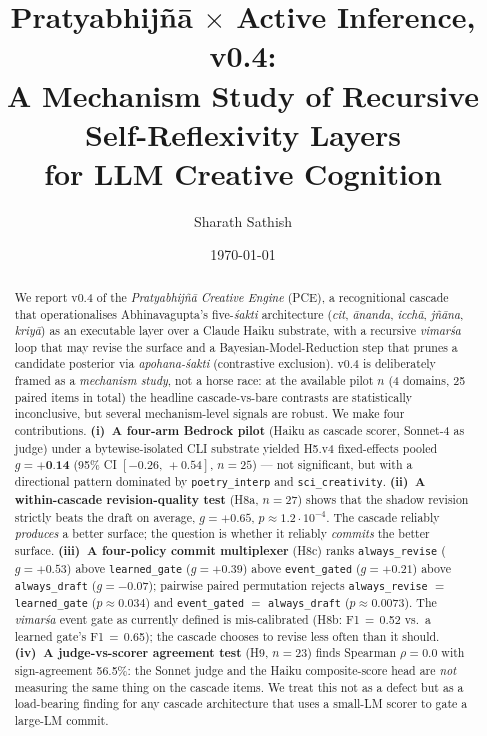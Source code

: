 \documentclass[11pt,a4paper]{article}
\title{Pratyabhij\~n\=a $\times$ Active Inference, v0.4:\\
A Mechanism Study of Recursive Self-Reflexivity Layers\\
for LLM Creative Cognition}
\author[1]{Sharath Sathish}
\affil[1]{Independent Researcher}
\date{\today}
\newcommand{\iast}[1]{\textit{#1}}
\begin{document}
\maketitle

\begin{abstract}
We report v0.4 of the \emph{Pratyabhij\~n\=a Creative Engine} (PCE), a recognitional cascade that operationalises Abhinavagupta's five-\iast{\'sakti} architecture (\iast{cit}, \iast{\=ananda}, \iast{icch\=a}, \iast{j\~n\=ana}, \iast{kriy\=a}) as an executable layer over a Claude Haiku substrate, with a recursive \iast{vimar\'sa} loop that may revise the surface and a Bayesian-Model-Reduction step that prunes a candidate posterior via \iast{apohana-\'sakti} (contrastive exclusion).
v0.4 is deliberately framed as a \emph{mechanism study}, not a horse race: at the available pilot $n$ (4 domains, 25 paired items in total) the headline cascade-vs-bare contrasts are statistically inconclusive, but several mechanism-level signals are robust. We make four contributions. \textbf{(i)~A four-arm Bedrock pilot} (Haiku as cascade scorer, Sonnet-4 as judge) under a bytewise-isolated CLI substrate yielded H5.v4 fixed-effects pooled $g=+\textbf{0.14}$ (95\% CI $[-0.26,\,+0.54]$, $n=25$) --- not significant, but with a directional pattern dominated by \texttt{poetry\_interp} and \texttt{sci\_creativity}.
\textbf{(ii)~A within-cascade revision-quality test} (H8a, $n=27$) shows that the shadow revision strictly beats the draft on average, $g=+0.65$, $p\approx 1.2\!\cdot\! 10^{-4}$. The cascade reliably \emph{produces} a better surface; the question is whether it reliably \emph{commits} the better surface.
\textbf{(iii)~A four-policy commit multiplexer} (H8c) ranks \texttt{always\_revise} ($g=+0.53$) above \texttt{learned\_gate} ($g=+0.39$) above \texttt{event\_gated} ($g=+0.21$) above \texttt{always\_draft} ($g=-0.07$); pairwise paired permutation rejects \texttt{always\_revise} $=$ \texttt{learned\_gate} ($p\approx 0.034$) and \texttt{event\_gated} $=$ \texttt{always\_draft} ($p\approx 0.0073$). The \iast{vimar\'sa} event gate as currently defined is mis-calibrated (H8b: F1$\,=\,$0.52 vs.\ a learned gate's F1$\,=\,$0.65); the cascade chooses to revise less often than it should.
\textbf{(iv)~A judge-vs-scorer agreement test} (H9, $n=23$) finds Spearman $\rho=0.0$ with sign-agreement 56.5\%: the Sonnet judge and the Haiku composite-score head are \emph{not} measuring the same thing on the cascade items. We treat this not as a defect but as a load-bearing finding for any cascade architecture that uses a small-LM scorer to gate a large-LM commit.

\end{abstract}
\end{document}

